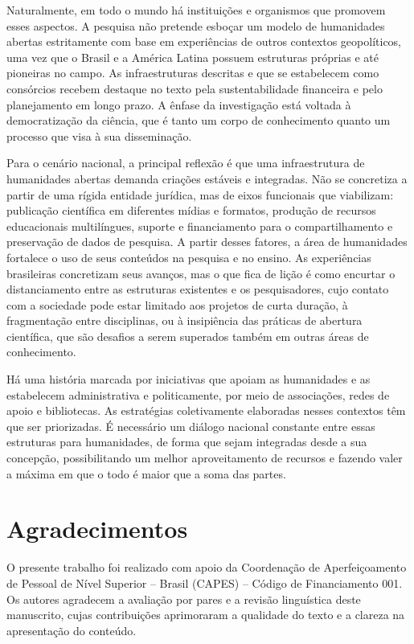 \documentclass[portuguese]{textolivre}
\begin{document}
Naturalmente, em todo o mundo há instituições e organismos que promovem esses aspectos. A pesquisa não pretende esboçar um modelo de humanidades abertas estritamente com base em experiências de outros contextos geopolíticos, uma vez que o Brasil e a América Latina possuem estruturas próprias e até pioneiras no campo. As infraestruturas descritas e que se estabelecem como consórcios recebem destaque no texto pela sustentabilidade financeira e pelo planejamento em longo prazo. A ênfase da investigação está voltada à democratização da ciência, que é tanto um corpo de conhecimento quanto um processo que visa à sua disseminação.

Para o cenário nacional, a principal reflexão é que uma infraestrutura de humanidades abertas demanda criações estáveis e integradas. Não se concretiza a partir de uma rígida entidade jurídica, mas de eixos funcionais que viabilizam: publicação científica em diferentes mídias e formatos, produção de recursos educacionais multilíngues, suporte e financiamento para o compartilhamento e preservação de dados de pesquisa. A partir desses fatores, a área de humanidades fortalece o uso de seus conteúdos na pesquisa e no ensino. As experiências brasileiras concretizam seus avanços, mas o que fica de lição é como encurtar o distanciamento entre as estruturas existentes e os pesquisadores, cujo contato com a sociedade pode estar limitado aos projetos de curta duração, à fragmentação entre disciplinas, ou à insipiência das práticas de abertura científica, que são desafios a serem superados também em outras áreas de conhecimento.

Há uma história marcada por iniciativas que apoiam as humanidades e as estabelecem administrativa e politicamente, por meio de associações, redes de apoio e bibliotecas. As estratégias coletivamente elaboradas nesses contextos têm que ser priorizadas. É necessário um diálogo nacional constante entre essas estruturas para humanidades, de forma que sejam integradas desde a sua concepção, possibilitando um melhor aproveitamento de recursos e fazendo valer a máxima em que o todo é maior que a soma das partes.

\section{Agradecimentos}\label{sec-idioma}
O presente trabalho foi realizado com apoio da Coordenação de Aperfeiçoamento de Pessoal de Nível Superior – Brasil (CAPES) – Código de Financiamento 001. Os autores agradecem a avaliação por pares e a revisão linguística deste manuscrito, cujas contribuições aprimoraram a qualidade do texto e a clareza na apresentação do conteúdo.
\end{document}
